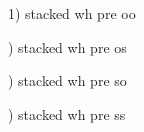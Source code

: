 \documentclass{article}
\begin{document}

1) stacked wh pre oo

\begin{center}

\end{center}

) stacked wh pre os
\begin{center}

\end{center}

) stacked wh pre so
\begin{center}

\end{center}

) stacked wh pre ss
\begin{center}

\end{center}
\end{document}
